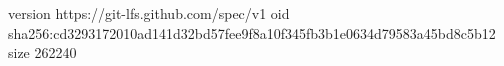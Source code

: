 version https://git-lfs.github.com/spec/v1
oid sha256:cd3293172010ad141d32bd57fee9f8a10f345fb3b1e0634d79583a45bd8c5b12
size 262240

